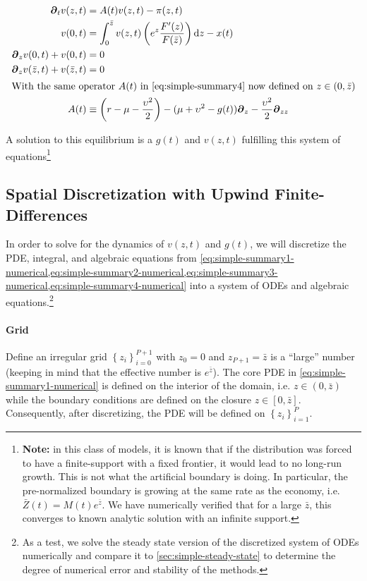 \documentclass[11pt]{article}
\newcommand{\D}[1][]{\ensuremath{\boldsymbol{\partial}_{#1}}}
\newcommand{\diff}{\ensuremath{\mathrm{d}}}
\newcommand{\set}[1]{\ensuremath{\left\{{#1}\right\}}}
\begin{document}
\begin{align}
\D[t]v(z,t) &= A(t)v(z,t) - \pi(z,t)\label{eq:simple-summary1-numerical}\\
v(0,t) &= \int_{0}^{\bar{z}}  v(z,t) \left(e^z \frac{F'(z)}{F(\bar{z})}\right) \diff z - x(t)\label{eq:simple-summary2-numerical}\\
\D[z]v(0,t) + v(0,t) &= 0\label{eq:simple-summary3-numerical}\\
\D[z]v(\bar{z},t) + v(\bar{z},t) &= 0\label{eq:simple-summary4-numerical}\\
\intertext{With the same operator $A(t)$ in \cref{eq:simple-summary4} now defined on $z \in (0,\bar{z})$}
A(t) &\equiv \left(r - \mu - \frac{\upsilon^2}{2}\right) - (\mu+ \upsilon^2 - g(t)) \D[z] - \frac{\upsilon^2}{2} \D[zz]\label{eq:simple-summary5-numerical}
\end{align}

\noindent A solution to this equilibrium is a $g(t)$ and $v(z,t)$ fulfilling this system of equations\footnote{\textbf{Note:} in this class of models, it is known that if the distribution was forced to have a finite-support with a fixed frontier, it would lead to no long-run growth.  This is not what the artificial boundary is doing.  In particular, the pre-normalized boundary is growing at the same rate as the economy, i.e. $\bar{Z}(t) = M(t) e^{\bar{z}}$.  We have numerically verified that for a large $\bar{z}$, this converges to known analytic solution with an infinite support.}

\subsection{Spatial Discretization with Upwind Finite-Differences}

In order to solve for the dynamics of $v(z,t)$ and $g(t)$, we will discretize the PDE, integral, and algebraic equations from \cref{eq:simple-summary1-numerical,eq:simple-summary2-numerical,eq:simple-summary3-numerical,eq:simple-summary4-numerical} into a system of ODEs and algebraic equations.\footnote{As a test, we solve the steady state version of the discretized system of ODEs numerically and compare it to \cref{sec:simple-steady-state} to determine the degree of numerical error and stability of the methods.}


\paragraph{Grid}

Define an irregular grid $\set{z_i}_{i=0}^{P+1}$ with $z_0 = 0$ and $z_{P+1} = \bar{z}$ is a ``large'' number (keeping in mind that the effective number is $e^{\bar{z}}$).  The core PDE in \cref{eq:simple-summary1-numerical} is defined on the interior of the domain, i.e. $z \in (0, \bar{z})$ while the boundary conditions are defined on the closure $z \in [0,\bar{z}]$.  Consequently, after discretizing, the PDE will be defined on $\set{z_i}_{i=1}^P$.
\end{document}
